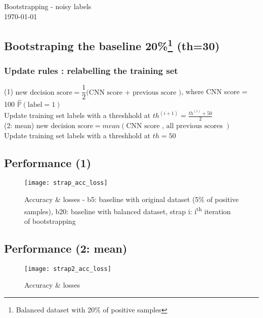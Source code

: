\documentclass[10pt]{article}
\newcommand{\1}{\mathbbm{1}}
\newcommand{\0}{\mathbf{0}}
\begin{document}
\begin{center}
\sc\Large Bootstrapping - noisy labels \\ {\small\today}
\end{center}
\vspace{-10pt}


\subsection*{Bootstraping the baseline 20\%\footnote{Balanced dataset with 20\% of positive samples}  (th=30) }
\subsubsection*{Update rules : relabelling the training set \label{score}}

(1) $\text{new decision score} =\dfrac12\bigg(\text{CNN score + previous score }\bigg)$, where CNN score = 100 $\hat{\mathbb P}(\text{label}=1)$\\
Update training set labels with a threshhold at $th^{(i+1)}=\frac{th^{(i)}+50}2$\\

\vspace{10pt}
(2: mean) $\text{new decision score} =mean(\text{CNN score , all previous scores })$\\
Update training set labels with a threshhold at $th=50$

\subsection*{Performance (1)}
\begin{figure}[H]
    \centering
\end{figure}
\begin{figure}[H]
    \centering
    \texttt{[image: strap\_acc\_loss]}
    \caption{Accuracy \& losses - b5: baseline with original dataset (5\% of positive samples), b20: baseline with balanced dataset, strap i: i\textsuperscript{th} iteration of bootstrapping }
\end{figure}

\subsection*{Performance (2: mean)}
\begin{figure}[H]
    \centering
\end{figure}
\begin{figure}[H]
    \centering
    \texttt{[image: strap2\_acc\_loss]}
    \caption{Accuracy \& losses}
\end{figure}
\end{document}
